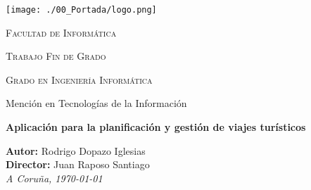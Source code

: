 \begin{titlepage}
\begin{center}
\thispagestyle{none}
\pagestyle{none}

\vspace*{1cm}
\texttt{[image: ./00\_Portada/logo.png]}

\textsc{Facultad de Informática}

\vspace*{1.5cm}

\textsc{\Large{Trabajo Fin de Grado}}

\vspace*{0.4cm}

\textsc{\Large{Grado en Ingeniería Informática}}

\vspace*{0.4cm}

\large{Mención en Tecnologías de la Información}

\vspace*{3cm}

\textbf{\Large{Aplicación para la planificación y gestión de viajes turísticos}}

\end{center}

\vspace*{4cm}

\begin{flushright}
\large{
\textbf{Autor: } Rodrigo Dopazo Iglesias\\
\textbf{Director: } Juan Raposo Santiago\\
\hfill \break
\textit{A Coruña, \today}}
\end{flushright}

\end{titlepage}